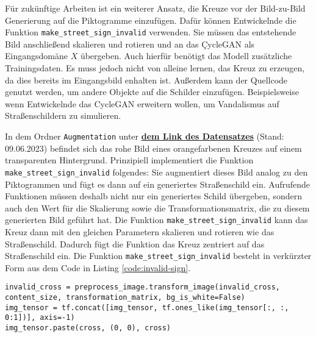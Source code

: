 Für zukünftige Arbeiten ist ein weiterer Ansatz, die Kreuze vor der Bild-zu-Bild Generierung auf die Piktogramme einzufügen. Dafür können Entwickelnde die Funktion \texttt{make_street_sign_invalid} verwenden. Sie müssen das entstehende Bild anschließend skalieren und rotieren und an das \c{CycleGAN} als Eingangsdomäne $X$ übergeben. Auch hierfür benötigt das Modell zusätzliche Trainingsdaten. Es muss jedoch nicht von alleine lernen, das Kreuz zu erzeugen, da dies bereits im Eingangsbild enhalten ist. Außerdem kann der Quellcode genutzt werden, um andere Objekte auf die Schilder einzufügen. Beispielsweise wenn Entwickelnde das \ac{CycleGAN} erweitern wollen, um Vandalismus auf Straßenschildern zu simulieren.

In dem Ordner \texttt{Augmentation} unter \href{https://drive.google.com/drive/u/1/folders/1UlZNFEDLymyMFw2BJZcfB2toAIlTVwGb}{\textbf{dem Link des Datensatzes}} (Stand: 09.06.2023) befindet sich das rohe Bild eines orangefarbenen Kreuzes auf einem transparenten Hintergrund. Prinzipiell implementiert die Funktion \texttt{make_street_sign_invalid} folgendes: Sie augmentiert dieses Bild analog zu den Piktogrammen und fügt es dann auf ein generiertes Straßenschild ein. Aufrufende Funktionen müssen deshalb nicht nur ein generiertes Schild übergeben, sondern auch den Wert für die Skalierung sowie die Transformationsmatrix, die zu diesem generierten Bild geführt hat. Die Funktion \texttt{make_street_sign_invalid} kann das Kreuz dann mit den gleichen Parametern skalieren und rotieren wie das Straßenschild. Dadurch fügt die Funktion das Kreuz zentriert auf das Straßenschild ein. Die Funktion \texttt{make_street_sign_invalid} besteht in verkürzter Form aus dem Code in Listing \ref{code:invalid-sign}.

\begin{code}
	\begin{verbatim}
invalid_cross = preprocess_image.transform_image(invalid_cross, content_size, transformation_matrix, bg_is_white=False)
img_tensor = tf.concat([img_tensor, tf.ones_like(img_tensor[:, :, 0:1])], axis=-1)
img_tensor.paste(cross, (0, 0), cross)
	\end{verbatim}
\end{code}

